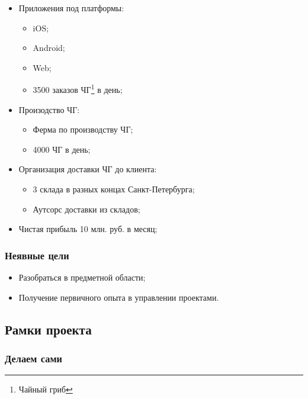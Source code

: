 \documentclass[a4paper,10pt]{article}
\begin{document}
    \begin{itemize}
        \item Приложения под платформы:
            \begin{itemize}
                \item iOS;
                \item Android;
                \item Web;
                \item 3500 заказов ЧГ\footnote{Чайный гриб} в день;
            \end{itemize}
        \item Произодство ЧГ:
            \begin{itemize}
                \item Ферма по производству ЧГ;
                \item 4000 ЧГ в день;
            \end{itemize}
        \item Организация доставки ЧГ до клиента:
            \begin{itemize}
                \item 3 склада в разных концах Санкт-Петербурга;
                \item Аутсорс доставки из складов;
            \end{itemize}
        \item Чистая прибыль 10 млн. руб. в месяц;
    \end{itemize}


\subsubsection{Неявные цели}

    \begin{itemize}
        \item Разобраться в предметной области;
        \item Получение первичного опыта в управлении проектами.
    \end{itemize}




\subsection{Рамки проекта}

\subsubsection{Делаем сами}
\end{document}
